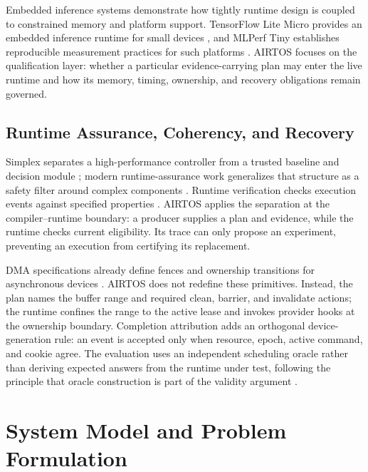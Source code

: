 \documentclass[lettersize,journal]{IEEEtran}
\begin{document}
Embedded inference systems demonstrate how tightly runtime design is coupled
to constrained memory and platform support. TensorFlow Lite Micro provides an
embedded inference runtime for small devices \cite{david2021tensorflow}, and
MLPerf Tiny establishes reproducible measurement practices for such platforms
\cite{banbury2021mlperf}. AIRTOS focuses on the qualification layer: whether a
particular evidence-carrying plan may enter the live runtime and how its
memory, timing, ownership, and recovery obligations remain governed.

\subsection{Runtime Assurance, Coherency, and Recovery}
Simplex separates a high-performance controller from a trusted baseline and
decision module \cite{seto1998simplex}; modern runtime-assurance work
generalizes that structure as a safety filter around complex components
\cite{hobbs2023runtime}. Runtime verification checks execution events against
specified properties \cite{leucker2009brief}. AIRTOS applies the separation at
the compiler--runtime boundary: a producer supplies a plan and evidence, while
the runtime checks current eligibility. Its trace can only propose an
experiment, preventing an execution from certifying its replacement.

DMA specifications already define fences and ownership transitions for
asynchronous devices \cite{documentation2026buffer,documentation2026dma}.
AIRTOS does not redefine these primitives. Instead, the plan names the buffer
range and required clean, barrier, and invalidate actions; the runtime confines
the range to the active lease and invokes provider hooks at the ownership
boundary. Completion attribution adds an orthogonal device-generation rule:
an event is accepted only when resource, epoch, active command, and cookie
agree. The evaluation uses an independent scheduling oracle rather than
deriving expected answers from the runtime under test, following the principle
that oracle construction is part of the validity argument \cite{barr2015oracle}.

\section{System Model and Problem Formulation}
\end{document}
